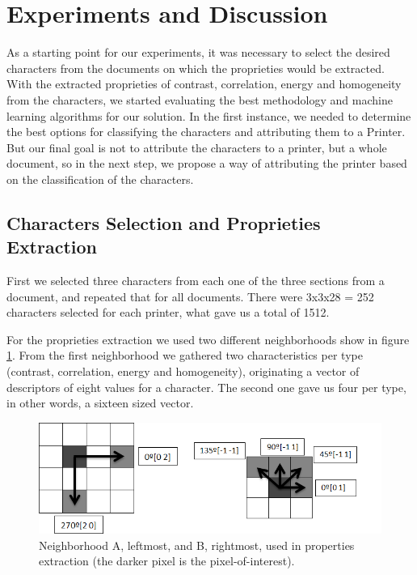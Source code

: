 \documentclass[10pt,twocolumn,letterpaper]{article}
\begin{document}
\section{Experiments and Discussion}
\label{sec:experiments}

As a starting point for our experiments, it was necessary to select the desired characters from the documents on which the proprieties would be extracted. With the extracted proprieties of contrast, correlation, energy and homogeneity from the characters, we started evaluating the best methodology and machine learning algorithms for our solution. In the first instance, we needed to determine the best options for classifying the characters and attributing them to a Printer. But our final goal is not to attribute the characters to a printer, but a whole document, so in the next step, we propose a way of attributing the printer based on the classification of the characters.

\subsection{Characters Selection and Proprieties Extraction}

First we selected three characters from each one of the three sections from a document, and repeated that for all documents. There were 3x3x28 = 252 characters selected for each printer, what gave us a total of 1512.

For the proprieties extraction we used two different neighborhoods show in figure \ref{fig:neighbor}. From the first neighborhood we gathered two characteristics per type (contrast, correlation, energy and homogeneity), originating a vector of descriptors of eight values for a character. The second one gave us four per type, in other words, a sixteen sized vector.

\begin{figure}
\begin{center}
	\includegraphics[width=0.99\columnwidth]{neighbor}
	\caption{Neighborhood A, leftmost, and B, rightmost, used in properties extraction (the darker pixel is the pixel-of-interest).}
\label{fig:neighbor}   
\end{center} 
\end{figure}
\end{document}

